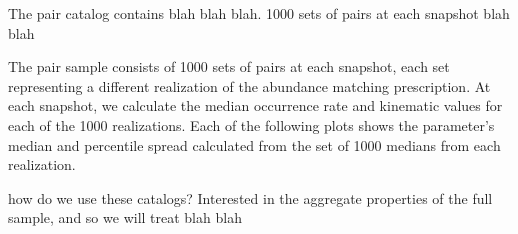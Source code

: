 \documentclass[twocolumn]{aastex631}
\begin{document}
        The pair catalog contains blah blah blah. 
        1000 sets of pairs at each snapshot blah blah 

        The pair sample consists of 1000 sets of pairs at each snapshot, each set representing a different realization of the abundance matching prescription. 
        At each snapshot, we calculate the median occurrence rate and kinematic values for each of the 1000 realizations. 
        Each of the following plots shows the parameter's median and percentile spread calculated from the set of 1000 medians from each realization.
        
        how do we use these catalogs? Interested in the aggregate properties of the full sample, and so we will treat blah blah 
    

\end{document}
